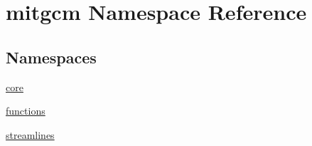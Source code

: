 \hypertarget{namespacemitgcm}{\section{mitgcm Namespace Reference}
\label{namespacemitgcm}
}
\subsection*{Namespaces}
\begin{DoxyCompactItemize}
\item 
 \hyperlink{namespacemitgcm_1_1core}{core}
\item 
 \hyperlink{namespacemitgcm_1_1functions}{functions}
\item 
 \hyperlink{namespacemitgcm_1_1streamlines}{streamlines}
\end{DoxyCompactItemize}
